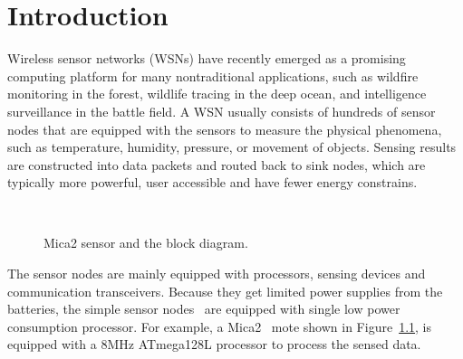 \chapter{Introduction}\label{chap:intro}


Wireless sensor networks (WSNs) have recently emerged as a promising computing platform for many nontraditional applications, such as wildfire monitoring in the forest, wildlife tracing in the deep ocean, and intelligence surveillance in the battle field. A WSN usually consists of hundreds of sensor nodes that are equipped with the sensors to measure the physical phenomena, such as temperature, humidity, pressure, or movement of objects. Sensing results are constructed into data packets and routed back to sink nodes, which are typically more powerful, user accessible and have fewer energy constrains.

\begin{figure}[h]
\centering
\mbox{
}
\caption{Mica2 sensor and the block diagram.}
\label{fig:mica2}
\end{figure}

The sensor nodes are mainly equipped with processors, sensing devices and communication transceivers. Because they get limited power supplies from the batteries, the simple sensor nodes~\cite{mica2-power, micaz-power,telos,telosb} are equipped with single low power consumption processor. 
For example, a Mica2~\cite{mica2-power} mote shown in Figure~\ref{fig:mica2}, is equipped with a 8MHz ATmega128L processor to process the sensed data.

